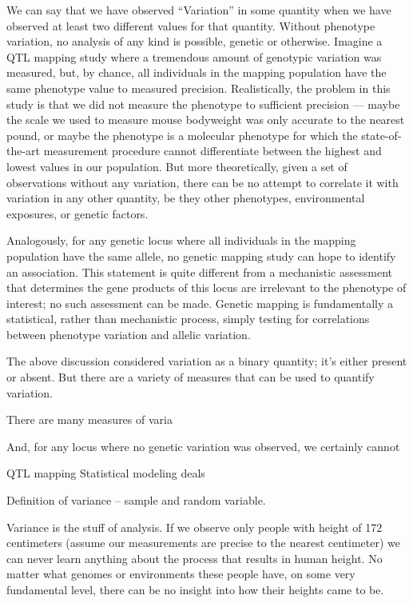 We can say that we have observed ``Variation'' in some quantity when we have observed at least two different values for that quantity.
Without phenotype variation, no analysis of any kind is possible, genetic or otherwise.
Imagine a QTL mapping study where a tremendous amount of genotypic variation was measured, but, by chance, all individuals in the mapping population have the same phenotype value to measured precision.
Realistically, the problem in this study is that we did not measure the phenotype to sufficient precision --- maybe the scale we used to measure mouse bodyweight was only accurate to the nearest pound, or maybe the phenotype is a molecular phenotype for which the state-of-the-art measurement procedure cannot differentiate between the highest and lowest values in our population.
But more theoretically, given a set of observations without any variation, there can be no attempt to correlate it with variation in any other quantity, be they other phenotypes, environmental exposures, or genetic factors.

Analogously, for any genetic locus where all individuals in the mapping population have the same allele, no genetic mapping study can hope to identify an association.
This statement is quite different from a mechanistic assessment that determines the gene products of this locus are irrelevant to the phenotype of interest; no such assessment can be made.
Genetic mapping is fundamentally a statistical, rather than mechanistic process, simply testing for correlations between phenotype variation and allelic variation.

The above discussion considered variation as a binary quantity; it's either present or absent.
But there are a variety of measures that can be used to quantify variation.


There are many measures of varia

And, for any locus where no genetic variation was observed, we certainly cannot 

QTL mapping Statistical modeling deals 

Definition of variance -- sample and random variable.

Variance is the stuff of analysis.
If we observe only people with height of 172 centimeters (assume our measurements are precise to the nearest centimeter) we can never learn anything about the process that results in human height.
No matter what genomes or environments these people have, on some very fundamental level, there can be no insight into how their heights came to be.

